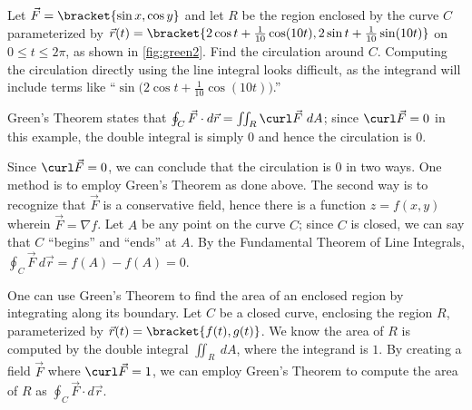 
\begin{example}\label{ex_green2}
Let $\vec F =\bracket{\sin x,\cos y}$ and let $R$ be the region enclosed by the curve $C$ parameterized by $\vec r(t) =\bracket{2\cos t+ \frac1{10}\cos(10t),2\sin t+\frac1{10}\sin(10t)}$ on $0\leq t\leq 2\pi$, as shown in \autoref{fig:green2}. Find the circulation around $C$.
\solution
Computing the circulation directly using the line integral looks difficult, as the integrand will include terms like ``$\sin\big(2\cos t + \frac1{10}\cos(10t)\big)$.'' 

Green's Theorem states that $\oint_C\vec F\cdot d\vec r = \iint_R \curl\vec F\ dA$; since $\curl \vec F = 0$ in this example, the double integral is simply 0 and hence the circulation is 0.

Since $\curl \vec F = 0$, we can conclude that the circulation is 0 in two ways. One method is to employ Green's Theorem as done above. The second way is to recognize that $\vec F$ is a conservative field, hence there is a function $z=f(x,y)$ wherein $\vec F = \nabla f$. Let $A$ be any point on the curve $C$; since $C$ is closed, we can say that $C$ ``begins'' and ``ends'' at $A$. By the Fundamental Theorem of Line Integrals, $\oint_C \vec F\ d\vec r = f(A)-f(A) = 0$.
\end{example}

One can use Green's Theorem to find the area of an enclosed region by integrating along its boundary. Let $C$ be a closed curve, enclosing the region $R$, parameterized by $\vec r(t) =\bracket{f(t),g(t)}$. We know the area of $R$ is computed by the double integral $\iint_R \ dA$, where the integrand is $1$. By creating a field $\vec F$ where $\curl \vec F =1$, we can employ Green's Theorem to compute the area of $R$ as $\oint_C \vec F\cdot d\vec r$. 

